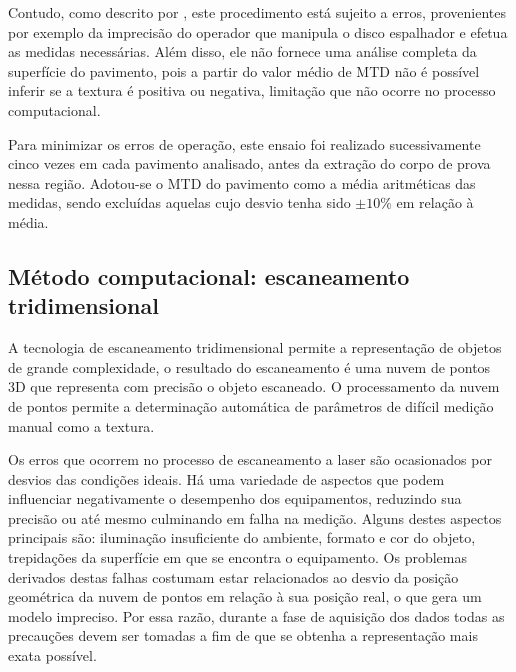 Contudo, como descrito por , este procedimento está sujeito a erros, provenientes por exemplo da imprecisão do operador que manipula o disco espalhador e efetua as medidas necessárias. Além disso, ele não fornece uma análise completa da superfície do pavimento, pois a partir do valor médio de MTD não é possível inferir se a textura é positiva ou negativa, limitação que não ocorre no processo computacional.

Para minimizar os erros de operação, este ensaio foi realizado sucessivamente cinco vezes em cada pavimento analisado, antes da extração do corpo de prova nessa região. Adotou-se o MTD do pavimento como a média aritméticas das medidas, sendo excluídas aquelas cujo desvio tenha sido $\pm10\%$ em relação à média. 

\subsection{Método computacional: escaneamento tridimensional}
A tecnologia de escaneamento tridimensional permite a representação de objetos de grande complexidade, o resultado do escaneamento é uma nuvem de pontos 3D que representa com precisão o objeto escaneado. O processamento da nuvem de pontos permite a determinação automática de parâmetros de difícil medição manual como a textura.

Os erros que ocorrem no processo de escaneamento a laser são ocasionados por desvios das condições ideais. Há uma variedade de aspectos que podem influenciar negativamente o desempenho dos equipamentos, reduzindo sua precisão ou até mesmo culminando em falha na medição. Alguns destes aspectos principais são: iluminação insuficiente do ambiente, formato e cor do objeto, trepidações da superfície em que se encontra o equipamento. Os problemas derivados destas falhas costumam estar relacionados ao desvio da posição geométrica da nuvem de pontos em relação à sua posição real, o que gera um modelo impreciso. Por essa razão, durante a fase de aquisição dos dados todas as precauções devem ser tomadas a fim de que se obtenha a representação mais exata possível.

